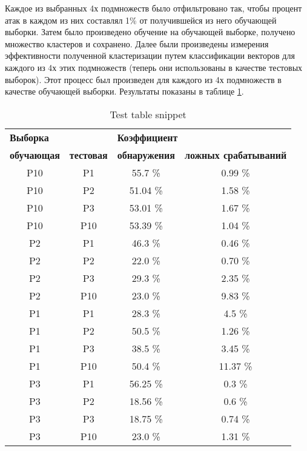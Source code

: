 \documentclass[12pt,a4paper]{article}
\begin{document}
Каждое из выбранных 4х подмножеств было отфильтровано так, чтобы процент атак в каждом из них составлял 1\% от получившейся
из него обучающей выборки. Затем было произведено обучение на обучающей выборке, получено множество кластеров и сохранено.
Далее были произведены измерения эффективности полученной кластеризации путем классификации векторов для каждого из 4х
этих подмножеств (теперь они использованы в качестве тестовых выборок). Этот процесс был произведен для каждого из 4х подмножеств
в качестве обучающей выборки. Результаты показаны в таблице \ref{table:training_test}.

\begin{table}
	\caption{Test table snippet}
	\label{table:training_test}
	\begin{center}
		\begin{tabular}{|c|c|c|c|}
		\hline

		\hline
		\multicolumn{2}{|l|}{\textbf{\hspace{35pt}Выборка}} & \multicolumn{2}{|l|}{\textbf{\hspace{45pt}Коэффициент}}\\

		\multicolumn{1}{|c|}{\textbf{обучающая}} & \multicolumn{1}{|c|}{\textbf{тестовая}} & \multicolumn{1}{|c|}{\textbf{обнаружения}} & \multicolumn{1}{|c|}{\textbf{ложных срабатываний}} \\
		\hline P10 & P1  & 55.7   \% & 0.99  \% \\
		\hline P10 & P2  & 51.04  \% & 1.58  \% \\
		\hline P10 & P3  & 53.01  \% & 1.67  \% \\
		\hline P10 & P10 & 53.39  \% & 1.04  \% \\
		\hline P2  & P1  & 46.3   \% & 0.46  \% \\
		\hline P2  & P2  & 22.0   \% & 0.70  \% \\
		\hline P2  & P3  & 29.3   \% & 2.35  \% \\
		\hline P2  & P10 & 23.0   \% & 9.83  \% \\
		\hline P1  & P1  & 28.3   \% & 4.5  \% \\
		\hline P1  & P2  & 50.5   \% & 1.26  \% \\
		\hline P1  & P3  & 38.5   \% & 3.45  \% \\
		\hline P1  & P10 & 50.4   \% & 11.37 \% \\
		\hline P3  & P1  & 56.25  \% & 0.3  \% \\
		\hline P3  & P2  & 18.56  \% & 0.6  \% \\
		\hline P3  & P3  & 18.75  \% & 0.74  \% \\
		\hline P3  & P10 & 23.0   \% & 1.31  \% \\
		\hline

		\hline
		\end{tabular}
	\end{center}
\end{table}
\end{document}
